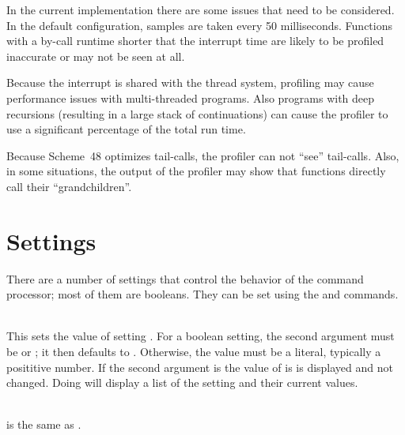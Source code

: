 In the current implementation there are some issues that need to be considered.
In the default configuration, samples are taken every 50 milliseconds. Functions with a by-call
runtime shorter that the interrupt time are likely to be profiled inaccurate or may not be seen at all.

Because the interrupt is shared with the thread system, profiling may cause performance issues
with multi-threaded programs. Also programs with deep recursions (resulting in a large stack of
continuations) can cause the profiler to use a significant percentage of the total run time.

Because Scheme~48 optimizes tail-calls, the profiler can not ``see'' tail-calls. Also, in some situations,
the output of the profiler may show that functions directly call their ``grandchildren''.


\section{Settings}

There are a number of settings that control the behavior of the
 command processor; most of them are booleans.
They can be set using the  and  commands.

\begin{description}
\item {}\\
    This sets the value of setting .
    For a boolean setting, the second argument must be  or
    ; it then defaults to .
    Otherwise, the value must be a literal, typically a posititive number.
    If the second argument is  the value of  is
    is displayed and not changed.
    Doing  will display a list of the setting and
    their current values.

\item {}\\
     is the same as
    .
\end{description}

